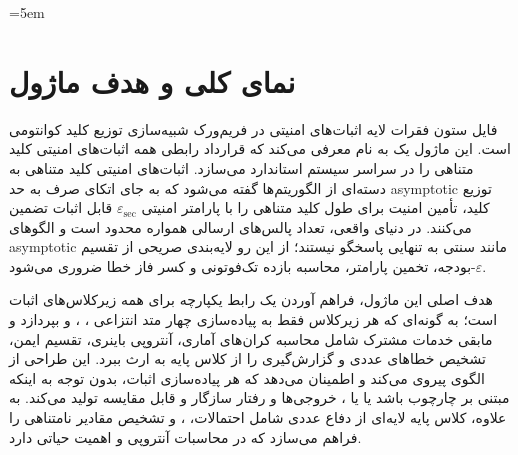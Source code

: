 \sloppy
\emergencystretch=5em

\section{نمای‌ کلی و هدف ماژول}

فایل  ستون فقرات لایه اثبات‌های امنیتی در فریم‌ورک شبیه‌سازی توزیع کلید کوانتومی است. این ماژول یک  به نام  معرفی می‌کند که قرارداد رابطی همه اثبات‌های امنیتی کلید متناهی را در سراسر سیستم استاندارد می‌سازد. اثبات‌های امنیتی کلید متناهی به دسته‌ای از الگوریتم‌ها گفته می‌شود که به جای اتکای صرف به حد asymptotic توزیع کلید، تأمین امنیت برای طول کلید متناهی را با پارامتر امنیتی $\varepsilon_{\text{sec}}$ قابل اثبات تضمین می‌کنند. در دنیای واقعی، تعداد پالس‌های ارسالی همواره محدود است و الگوهای asymptotic مانند  سنتی به تنهایی پاسخگو نیستند؛ از این رو لایه‌بندی صریحی از تقسیم $\varepsilon$-بودجه، تخمین پارامتر، محاسبه بازده تک‌فوتونی و کسر فاز خطا ضروری می‌شود.

هدف اصلی این ماژول، فراهم آوردن یک رابط یکپارچه برای همه زیرکلاس‌های اثبات است؛ به گونه‌ای که هر زیرکلاس فقط به پیاده‌سازی چهار متد انتزاعی ، ،  و  بپردازد و مابقی خدمات مشترک شامل محاسبه کران‌های آماری، آنتروپی باینری، تقسیم ایمن، تشخیص خطاهای عددی و گزارش‌گیری  را از کلاس پایه به ارث ببرد. این طراحی از الگوی  پیروی می‌کند و اطمینان می‌دهد که هر پیاده‌سازی اثبات، بدون توجه به اینکه مبتنی بر چارچوب  باشد یا  یا ، خروجی‌ها و رفتار سازگار و قابل مقایسه تولید می‌کند. به علاوه، کلاس پایه لایه‌ای از دفاع عددی شامل  احتمالات، ،  و تشخیص مقادیر نامتناهی را فراهم می‌سازد که در محاسبات آنتروپی و  اهمیت حیاتی دارد.

